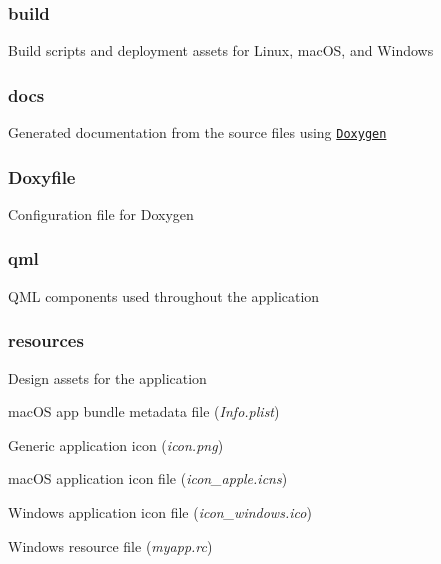 \subsubsection*{build}


\begin{DoxyItemize}
\item Build scripts and deployment assets for Linux, mac\+OS, and Windows
\end{DoxyItemize}

\subsubsection*{docs}


\begin{DoxyItemize}
\item Generated documentation from the source files using \href{http://www.doxygen.nl}{\tt Doxygen}
\end{DoxyItemize}

\subsubsection*{Doxyfile}


\begin{DoxyItemize}
\item Configuration file for Doxygen
\end{DoxyItemize}

\subsubsection*{qml}


\begin{DoxyItemize}
\item Q\+ML components used throughout the application
\end{DoxyItemize}

\subsubsection*{resources}


\begin{DoxyItemize}
\item Design assets for the application
\item mac\+OS app bundle metadata file ({\itshape Info.\+plist})
\item Generic application icon ({\itshape icon.\+png})
\item mac\+OS application icon file ({\itshape icon\+\_\+apple.\+icns})
\item Windows application icon file ({\itshape icon\+\_\+windows.\+ico})
\item Windows resource file ({\itshape myapp.\+rc})
\end{DoxyItemize}

